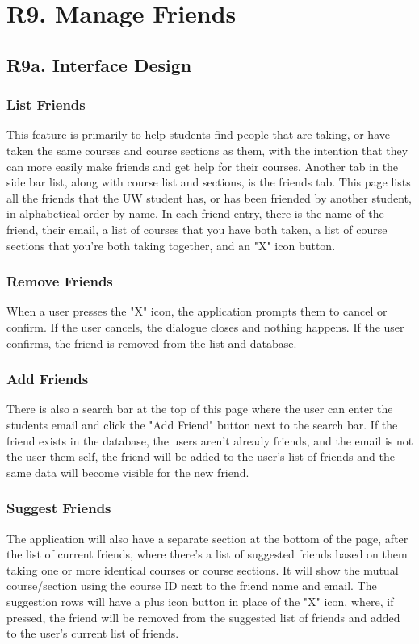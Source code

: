\documentclass[12pt, a4paper]{article}
\begin{document}
\section*{R9. Manage Friends}
\label{sec:R9}
\subsection*{R9a. Interface Design}
\subsubsection*{List Friends}
This feature is primarily to help students find people that are taking, or have taken the same courses and course sections as them, with the intention that they can more easily make friends and get help for their courses. Another tab in the side bar list, along with course list and sections, is the friends tab. This page lists all the friends that the UW student has, or has been friended by another student, in alphabetical order by name. In each friend entry, there is the name of the friend, their email, a list of courses that you have both taken, a list of course sections that you're both taking together, and an "X" icon button. 
\subsubsection*{Remove Friends}
When a user presses the "X" icon, the application prompts them to cancel or confirm. If the user cancels, the dialogue closes and nothing happens. If the user confirms, the friend is removed from the list and database. 
\subsubsection*{Add Friends}
There is also a search bar at the top of this page where the user can enter the students email and click the "Add Friend" button next to the search bar. If the friend exists in the database, the users aren't already friends, and the email is not the user them self, the friend will be added to the user's list of friends and the same data will become visible for the new friend.
\subsubsection*{Suggest Friends}
The application will also have a separate section at the bottom of the page, after the list of current friends, where there's a list of suggested friends based on them taking one or more identical courses or course sections. It will show the mutual course/section using the course ID next to the friend name and email. The suggestion rows will have a plus icon button in place of the "X" icon, where, if pressed, the friend will be removed from the suggested list of friends and added to the user's current list of friends.
\end{document}
